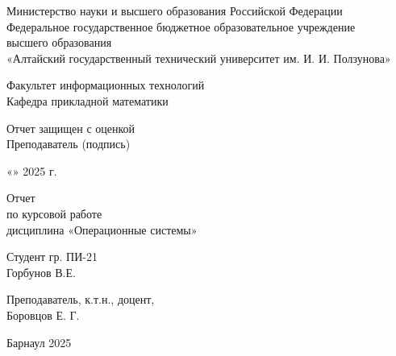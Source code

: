 \begin{titlepage}

    \begin{center}
        Министерство науки и высшего образования Российской Федерации \\
        Федеральное государственное бюджетное образовательное учреждение \\
        высшего образования \\
        «Алтайский государственный технический университет им. И. И. Ползунова»
    \end{center}
    \vskip 1cm 
    Факультет информационных технологий \\
    Кафедра прикладной математики
    
    \vskip 2cm 
    
    \begin{flushright}
        \parbox{8cm}{
            Отчет защищен с оценкой \hrulefill  \\
            Преподаватель \hrulefill (подпись)  \\
            \centerline{«\hrf{0.7cm}» \hrf{2.2cm} 2025 г.}
        }
    \end{flushright}
    
    \vskip 3cm 
    
    \begin{center}
        Отчет \\
        по курсовой работе \\
        дисциплина «Операционные системы»
    \end{center}
    
    \vskip 4cm 
    
    \begin{flushright}
        Студент гр. ПИ-21 \\
        Горбунов В.Е.
        
        Преподаватель, к.т.н., доцент, \\
        Боровцов Е. Г.        
    \end{flushright}
    
    \vskip 4cm 
    
    \centerline{Барнаул 2025}
    
    \end{titlepage}